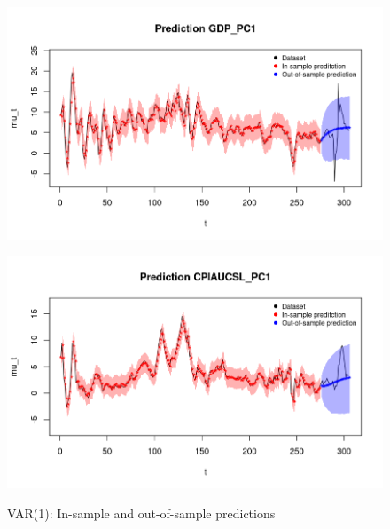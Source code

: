 \begin{figure}[h]
    \centering
    \begin{minipage}[t]{0.7\textwidth}
        \centering
        \includegraphics[width=\textwidth]{../Images/6-VAR/gdp_prediction.png}
        \label{fig:VAR_first}
    \end{minipage}
    \begin{minipage}[t]{0.7\textwidth}
        \centering
        \includegraphics[width=\textwidth]{../Images/6-VAR/infl_prediction.png}
        \label{fig:VAR_second}
    \end{minipage}
    \caption{VAR(1): In-sample and out-of-sample predictions}
    \label{fig:VAR_combined}
\end{figure}